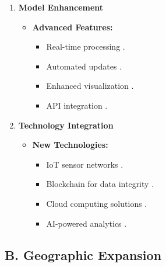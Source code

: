 \documentclass[a4paper]{report}
\begin{document}
\begin{enumerate}
    \item \textbf{Model Enhancement}
    \begin{itemize}
        \item \textbf{Advanced Features:}
        \begin{itemize}
            \item Real-time processing \cite{johnson2024}.
            \item Automated updates \cite{brown2023}.
            \item Enhanced visualization \cite{martin2024}.
            \item API integration \cite{williams2024}.
        \end{itemize}
    \end{itemize}

    \item \textbf{Technology Integration}
    \begin{itemize}
        \item \textbf{New Technologies:}
        \begin{itemize}
            \item IoT sensor networks \cite{taylor2023}.
            \item Blockchain for data integrity \cite{johnson2023}.
            \item Cloud computing solutions \cite{evans2024}.
            \item AI-powered analytics \cite{foster2024}.
        \end{itemize}
    \end{itemize}
\end{enumerate}

\subsection*{B. Geographic Expansion}
\end{document}
